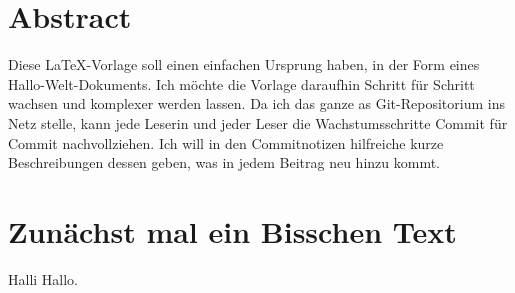 \documentclass[11pt,a4paper,twoside,titlepage]{book}
\begin{document}
\frontmatter
\chapter{Abstract}%
Diese LaTeX-Vorlage soll einen einfachen Ursprung haben, in der Form eines Hallo-Welt-Dokuments. Ich möchte die Vorlage daraufhin Schritt für Schritt wachsen und komplexer werden lassen. Da ich das ganze as Git-Repositorium ins Netz stelle, kann jede Leserin und jeder Leser die Wachstumsschritte Commit für Commit nachvollziehen. Ich will in den Commitnotizen hilfreiche kurze Beschreibungen dessen geben, was in jedem Beitrag neu hinzu kommt.

\mainmatter
\chapter{Zunächst mal ein Bisschen Text}%
Halli Hallo.
\end{document}
